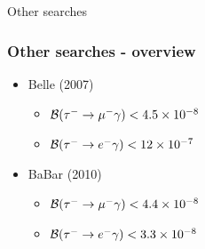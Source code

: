 \documentclass[xcolor=table]{beamer}
\begin{document}
\begin{frame}

\begin{center}
{\Huge Other searches}
\end{center}

\end{frame}


\begin{frame}
\frametitle{Other searches - overview}

\begin{itemize}
\item Belle (2007) 
\begin{itemize}
\item $\mathcal{B}(\tau^{-}\to\mu^{-}\gamma)<\SI{4.5d-8}{}$
\item $\mathcal{B}(\tau^{-}\to e^{-}\gamma)<\SI{12d-7}{}$
\end{itemize}
\item BaBar (2010)
\begin{itemize}
\item $\mathcal{B}(\tau^{-}\to\mu^{-}\gamma)<\SI{4.4d-8}{}$
\item $\mathcal{B}(\tau^{-}\to e^{-}\gamma)<\SI{3.3d-8}{}$
\end{itemize}
\end{itemize}

\end{frame}
\end{document}
